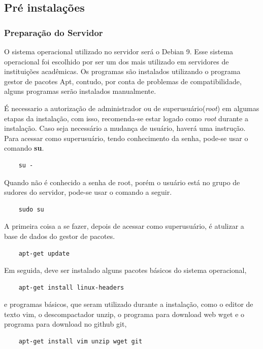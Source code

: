 \documentclass[12pt,hidelinks]{article}
\begin{document}
    \subsection{Pré instalações}

        \subsubsection{Preparação do Servidor}
        
            \qquad O sistema operacional utilizado no servidor será o Debian 9. Esse sistema operacional foi escolhido por ser um dos mais utilizado em servidores de instituições acadêmicas. Os programas são instalados utilizando o programa gestor de pacotes Apt, contudo, por conta de problemas de compatibilidade, alguns programas serão instalados manualmente.
            
            É necessario a autorização de administrador ou de superusuário(\textit{root}) em algumas etapas da instalação, com isso, recomenda-se estar logado como \textit{root} durante a instalação. Caso seja necessário a mudança de usuário, haverá uma instrução. Para acessar como superusuário, tendo conhecimento da senha, pode-se usar o comando \textbf{su}.
            \begin{verbatim}
    su -
            \end{verbatim}
            Quando não é conhecido a senha de root, porém o usuário está no grupo de sudores do servidor, pode-se usar o comando a seguir.
            \begin{verbatim}
    sudo su
            \end{verbatim}
            
            A primeira coisa a se fazer, depois de acessar como superusuário, é atulizar a base de dados do gestor de pacotes.

            \begin{verbatim}
    apt-get update
            \end{verbatim}
\newpage
            Em seguida, deve ser instalado alguns pacotes básicos do sistema operacional,
            \begin{verbatim}
    apt-get install linux-headers
            \end{verbatim}
            e programas básicos, que seram utilizado durante a instalação, como o editor de texto vim, o descompactador unzip, o programa para download web wget e o programa para download no github git,
            \begin{verbatim}
    apt-get install vim unzip wget git
            \end{verbatim}
            
\end{document}
